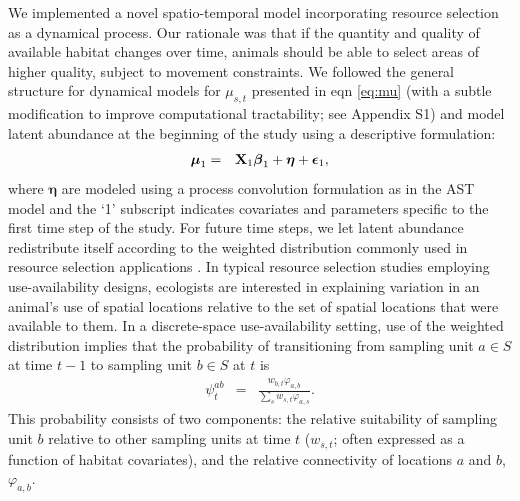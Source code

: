 \documentclass[times,mee,doublespace,]{besauth2}
\begin{document}
We implemented a novel spatio-temporal model incorporating resource selection as a dynamical process.  Our rationale was that if the quantity and quality of available habitat changes over time, animals should be able to select areas of higher quality, subject to movement constraints.
We followed the general structure for dynamical models for $\mu_{s,t}$ presented in eqn \ref{eq:mu} (with a subtle modification to improve computational tractability; see Appendix S1) and model latent abundance at the beginning of the study using a descriptive formulation:
\begin{eqnarray*}
  \boldsymbol{\mu}_{1} & = & {\bf X}_{1} \boldsymbol{\beta}_1 + \boldsymbol{\eta} + \boldsymbol{\epsilon}_1,
\end{eqnarray*}
where $\boldsymbol{\eta}$ are modeled using a process convolution formulation as in the AST model and the `1' subscript indicates covariates and parameters specific to the first time step of the study.  For future time steps, we let latent abundance redistribute itself according to the weighted distribution commonly used in resource selection applications \citep[cf.][]{PatilRao1978,LeleKeim2006}.  In typical resource selection studies employing use-availability designs, ecologists are interested in explaining variation in an animal's use of spatial locations relative to the set of spatial locations that were available to them.  In a discrete-space use-availability setting, use of the weighted distribution implies that the probability of transitioning from sampling unit $a \in S$ at time $t-1$ to sampling unit $b \in S$ at $t$ is
\begin{eqnarray}
  \psi^{ab}_t & = & \frac{w_{b,t} \varphi_{a,b}}{\sum_s w_{s,t} \varphi_{a,s}}. \label{eq:psi}
\end{eqnarray}
This probability consists of two components: the relative suitability of sampling unit $b$ relative to other sampling units at time $t$ ($w_{s,t}$; often expressed as a function of habitat covariates), and the relative connectivity of locations $a$ and $b$, $\varphi_{a,b}$.
\end{document}
